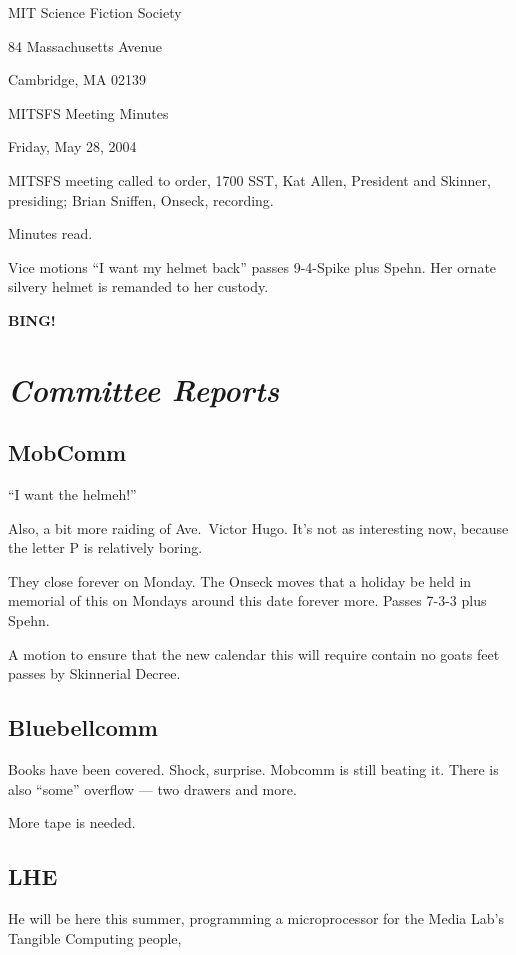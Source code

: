 \documentclass[10pt]{article}
\newcommand{\bing}{{\bf BING!} }
\newcommand{\goto}[1]{\bing \vskip 12pt \section*{{\em{#1}}}}
\newcommand{\ps}{ plus Spehn\xspace}
\begin{document}
\begin{center}

MIT Science Fiction Society 

84 Massachusetts Avenue

Cambridge, MA 02139

\vspace{12pt}

MITSFS Meeting Minutes 

Friday, May 28, 2004

\end{center}
 
\vspace{18pt}

\setlength{\parskip}{6pt}

\noindent
MITSFS meeting called to order, 1700 SST, Kat Allen, President and
Skinner, presiding; Brian Sniffen,  Onseck, recording.

Minutes read.

Vice motions ``I want my helmet back'' passes 9-4-Spike\ps.  Her
ornate silvery helmet is remanded to her custody.

\goto{Committee Reports}
\subsection*{MobComm}
``I want the helmeh!''

Also, a bit more raiding of Ave.\ Victor Hugo.  It's not as interesting
now, because the letter P is relatively boring.

They close forever on Monday.  The Onseck moves that a holiday be held
in memorial of this on Mondays around this date forever more.  Passes 7-3-3\ps.

A motion to ensure that the new calendar this will require contain no
goats feet passes by Skinnerial Decree.

\subsection*{Bluebellcomm}
Books have been covered.  Shock, surprise.
Mobcomm is still beating it.  There is also ``some'' overflow --- two
drawers and more.

More tape is needed.

\subsection*{LHE}
He will be here this summer, programming a microprocessor for the
Media Lab's Tangible Computing people, 
\end{document}
